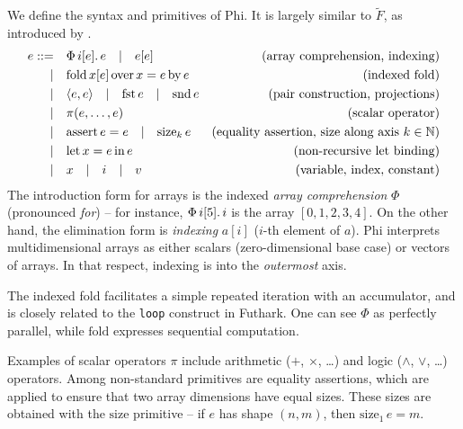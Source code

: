 \newcommand{\philet}[3]{\mathrm{let}\,{#1}={#2}\,\mathrm{in}\,{#3}}
\newcommand{\phivec}[3]{\Phi\, {#1}[{#2}] \ldotp {#3}}
\newcommand{\phifold}[5]{\mathrm{fold}\,{#1}[{#2}]\,\mathrm{over}\,{#3} = {#4}\,\mathrm{by}\,{#5}}
\newcommand{\phipair}[2]{\left\langle {#1}, {#2} \right\rangle}
\newcommand{\phifst}[1]{\mathrm{fst}\,{#1}}
\newcommand{\phisnd}[1]{\mathrm{snd}\,{#1}}
\newcommand{\phisize}[2]{\mathrm{size}_{#2}\, {#1}}
\newcommand{\phiasserteq}[2]{\mathrm{assert}\,{#1}={#2}}

We define the syntax and primitives of Phi. It is largely similar to $\tilde F$, as introduced by \textcite{shaikhha2019efficient}.
\begin{align*}
e ::=&\quad \phivec{i}{e}{e} \quad|\quad e[e]   &\text{(array comprehension, indexing)} \\
|&\quad \phifold{x}{e}{x}{e}{e}  &\text{(indexed fold)} \\
|&\quad \phipair{e}{e} \quad|\quad \phifst{e} \quad|\quad \phisnd{e} &\text{(pair construction, projections)} \\
|&\quad \pi(e, \dots, e) &\text{(scalar operator)} \\
|&\quad \phiasserteq{e}{e} \quad|\quad \phisize{e}{k} &\text{(equality assertion, size along axis } k \in \mathbb N \text{)} \\
|&\quad \philet{x}{e}{e} &\text{(non-recursive let binding)} \\
|&\quad x \quad|\quad i \quad|\quad v &\text{(variable, index, constant)}
\end{align*}
The introduction form for arrays is the indexed \textit{array comprehension} $\Phi$ (pronounced \textit{for}) -- for instance, $\phivec{i}{5}{i}$ is the array $[0, 1, 2, 3, 4]$. On the other hand, the elimination form is \textit{indexing} $a[i]$ ($i$-th element of $a$). Phi interprets multidimensional arrays as either scalars (zero-dimensional base case) or vectors of arrays. In that respect, indexing is into the \textit{outermost} axis. 

The indexed fold facilitates a simple repeated iteration with an accumulator, and is closely related to the \texttt{loop} construct in Futhark. One can see $\Phi$ as perfectly parallel, while $\mathrm{fold}$ expresses sequential computation.

Examples of scalar operators $\pi$ include arithmetic ($+$, $\times$, \dots) and logic ($\land$, $\lor$, \dots) operators. Among non-standard primitives are equality assertions, which are applied to ensure that two array dimensions have equal sizes. These sizes are obtained with the $\mathrm{size}$ primitive -- if $e$ has shape $(n, m)$, then $\phisize{e}{1} = m$.

